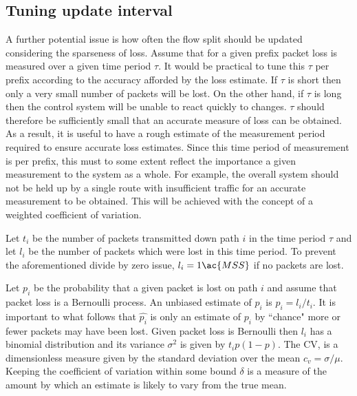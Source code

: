 \subsection{Tuning update interval}
A further potential issue is how often the flow split should be updated considering the sparseness of loss.
Assume that for a given prefix packet loss is measured over a given time period $\tau$.  
It would be practical to tune this $\tau$ per prefix according to the accuracy afforded by the loss estimate.
If $\tau$ is short then only a very small number of packets will be lost. 
On the other hand, if $\tau$ is long then the control system will be unable to react quickly to changes.  
$\tau$ should therefore be sufficiently small that an accurate measure of loss can be obtained.  
As a result, it is useful to have a rough estimate of the measurement period required to ensure accurate loss estimates.
Since this time period of measurement is per prefix, this must to some extent reflect the importance a given measurement to the system as a whole.
For example, the overall system should not be held up by a single route with insufficient traffic for an accurate measurement to be obtained.
This will be achieved with the concept of a weighted coefficient of variation.

Let $t_i$ be the number of packets transmitted down path $i$ in the time period $\tau$ and let $l_i$ be the number of packets which were lost in this time period.
To prevent the aforementioned divide by zero issue, $l_i = 1\ac{MSS}$ if no packets are lost.

Let $p_i$ be the probability that a given packet is lost on path $i$ and assume that packet loss is a Bernoulli process.  
An unbiased estimate of $p_i$ is $\hat{p_i} = l_i/t_i$.
It is important to what follows that $\hat{p_i}$ is only an estimate of $p_i$ by ``chance" more or fewer packets may have been lost.
Given packet loss is Bernoulli then $l_i$ has a binomial distribution and its variance $\sigma^2$ is given by $t_i p(1-p)$.  
The \ac{CV}, is a dimensionless measure given by the standard deviation over the mean $c_v= \sigma/\mu$.  
Keeping the coefficient of variation within some bound $\delta$ is a measure of the amount by which an estimate is likely to vary from the true mean.

